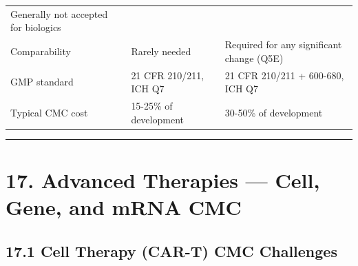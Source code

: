 \documentclass[
  11pt,
  a4paper,
]{report}
\begin{document}
\begin{longtable}[]{@{}lll@{}}
\begin{minipage}[t]{0.28\columnwidth}
Generally not accepted for biologics\strut
\end{minipage}\tabularnewline
\begin{minipage}[t]{0.22\columnwidth}\raggedright
Comparability\strut
\end{minipage} & \begin{minipage}[t]{0.41\columnwidth}\raggedright
Rarely needed\strut
\end{minipage} & \begin{minipage}[t]{0.28\columnwidth}\raggedright
Required for any significant change (Q5E)\strut
\end{minipage}\tabularnewline
\begin{minipage}[t]{0.22\columnwidth}\raggedright
GMP standard\strut
\end{minipage} & \begin{minipage}[t]{0.41\columnwidth}\raggedright
21 CFR 210/211, ICH Q7\strut
\end{minipage} & \begin{minipage}[t]{0.28\columnwidth}\raggedright
21 CFR 210/211 + 600-680, ICH Q7\strut
\end{minipage}\tabularnewline
\begin{minipage}[t]{0.22\columnwidth}\raggedright
Typical CMC cost\strut
\end{minipage} & \begin{minipage}[t]{0.41\columnwidth}\raggedright
15-25\% of development\strut
\end{minipage} & \begin{minipage}[t]{0.28\columnwidth}\raggedright
30-50\% of development\strut
\end{minipage}\tabularnewline
\bottomrule
\end{longtable}

\begin{center}\rule{0.5\linewidth}{0.5pt}\end{center}

\hypertarget{advanced-therapies-cell-gene-and-mrna-cmc}{%
\section{17. Advanced Therapies --- Cell, Gene, and mRNA
CMC}\label{advanced-therapies-cell-gene-and-mrna-cmc}}

\hypertarget{cell-therapy-car-t-cmc-challenges}{%
\subsection{17.1 Cell Therapy (CAR-T) CMC
Challenges}\label{cell-therapy-car-t-cmc-challenges}}
\end{document}
